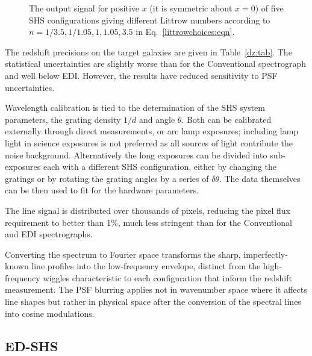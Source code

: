 \documentclass[preprint2, 10pt]{aastex}
\begin{document}
\begin{figure}[t]
   \centering
   \caption{The output signal for positive $x$ (it is symmetric about 
$x=0$) of five SHS configurations giving different
   Littrow numbers according to 
   $n=1/3.5, 1/1.05, 1, 1.05, 3.5$  in Eq.~\ref{littrowchoices:eqn}. 
   \label{shscounts:fig}}
\end{figure}

The redshift precisions on the target galaxies are given in Table~\ref{dz:tab}.  The statistical uncertainties are slightly worse than for
the Conventional spectrograph and well below EDI.  However, the results have reduced sensitivity to PSF uncertainties.

Wavelength calibration is tied to the determination of the SHS system parameters, the grating density $1/d$ and angle $\theta$.
Both can be calibrated externally through direct measurements, or arc lamp exposures; including lamp light
in science exposures is not preferred as all sources of light contribute the noise background.
Alternatively
the long exposures can be divided into sub-exposures each with a different SHS configuration, either by changing the
gratings or by rotating the grating angles by a series of $\delta \theta$.  The data themselves can be then used to fit for
the hardware parameters.

The line signal is distributed over thousands of pixels, reducing the pixel flux requirement to better than 1\%, much less stringent
than for the Conventional and EDI spectrographs.

Converting the spectrum to Fourier space transforms the sharp, imperfectly-known line profiles into the low-frequency envelope,
distinct from the high-frequency wiggles characteristic to each configuration that inform the redshift measurement.
The PSF blurring applies not in wavenumber space where it affects
line shapes but rather in physical space after the conversion of the spectral lines into cosine modulations. 

\subsection{ED-SHS} 
\end{document}

